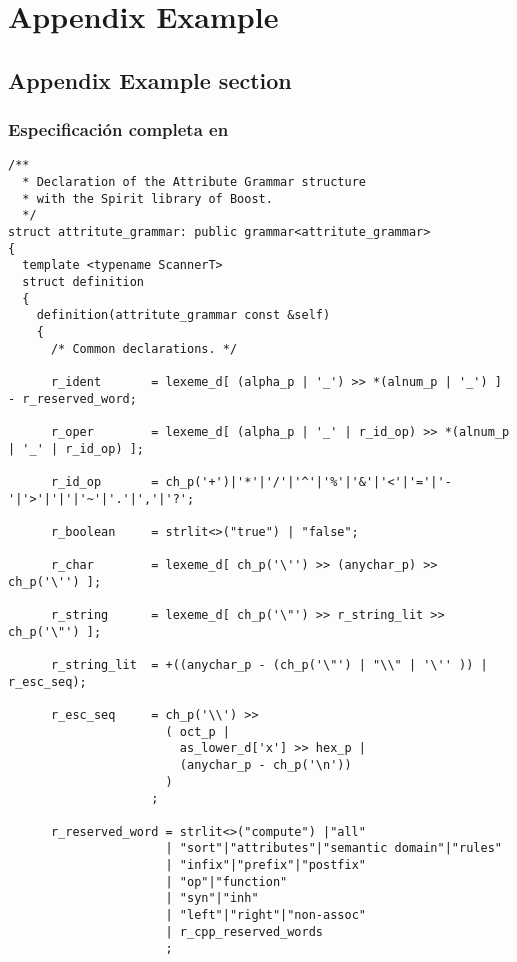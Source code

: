 \chapter{Appendix Example}
\label{chap:appendix1}

\section{Appendix Example section}

\subsection{Especificación completa en \spirit}
\label{append:grammarspirit}
\begin{center}\lstset{language=C++}
\begin{lstlisting}
/**
  * Declaration of the Attribute Grammar structure
  * with the Spirit library of Boost.
  */
struct attritute_grammar: public grammar<attritute_grammar>
{
  template <typename ScannerT>
  struct definition
  {
    definition(attritute_grammar const &self)
    {
      /* Common declarations. */

      r_ident       = lexeme_d[ (alpha_p | '_') >> *(alnum_p | '_') ] - r_reserved_word;

      r_oper        = lexeme_d[ (alpha_p | '_' | r_id_op) >> *(alnum_p | '_' | r_id_op) ];

      r_id_op       = ch_p('+')|'*'|'/'|'^'|'%'|'&'|'<'|'='|'-'|'>'|'|'|'~'|'.'|','|'?';

      r_boolean     = strlit<>("true") | "false";

      r_char        = lexeme_d[ ch_p('\'') >> (anychar_p) >> ch_p('\'') ];

      r_string      = lexeme_d[ ch_p('\"') >> r_string_lit >> ch_p('\"') ];

      r_string_lit  = +((anychar_p - (ch_p('\"') | "\\" | '\'' )) | r_esc_seq);

      r_esc_seq     = ch_p('\\') >>
                      ( oct_p |
                        as_lower_d['x'] >> hex_p |
                        (anychar_p - ch_p('\n'))
                      )
                    ;

      r_reserved_word = strlit<>("compute") |"all"
                      | "sort"|"attributes"|"semantic domain"|"rules"
                      | "infix"|"prefix"|"postfix"
                      | "op"|"function"
                      | "syn"|"inh"
                      | "left"|"right"|"non-assoc"
                      | r_cpp_reserved_words
                      ;


\end{lstlisting}
\end{center}
